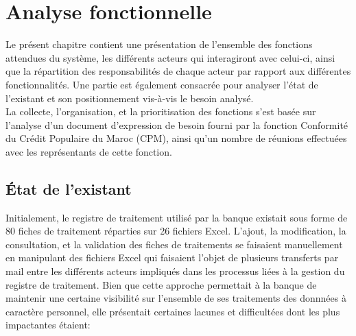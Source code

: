 \chapter{Analyse fonctionnelle}

Le présent chapitre contient une présentation de l'ensemble des fonctions attendues du système, les différents acteurs qui interagiront avec celui-ci, ainsi que la répartition des responsabilités de chaque acteur par rapport aux différentes fonctionnalités. Une partie est également consacrée pour analyser l'état de l'existant et son positionnement vis-à-vis le besoin analysé. \\

\noindent La collecte, l'organisation, et la prioritisation des fonctions s'est basée sur l'analyse d'un document d'expression de besoin fourni par la fonction Conformité du Crédit Populaire du Maroc (CPM), ainsi qu'un nombre de réunions effectuées avec les représentants de cette fonction. \\

\clearpage



\section{État de l'existant}
Initialement, le registre de traitement utilisé par la banque existait sous forme de 80 fiches de traitement réparties sur 26 fichiers Excel. L'ajout, la modification, la consultation, et la validation des fiches de traitements se faisaient manuellement en manipulant des fichiers Excel qui faisaient l'objet de plusieurs transferts par mail entre les différents acteurs impliqués dans les processus liées à la gestion du registre de traitement. Bien que cette approche permettait à la banque de maintenir une certaine visibilité sur l'ensemble de ses traitements des donnnées à caractère personnel, elle présentait certaines lacunes et difficultées dont les plus impactantes étaient: \\

